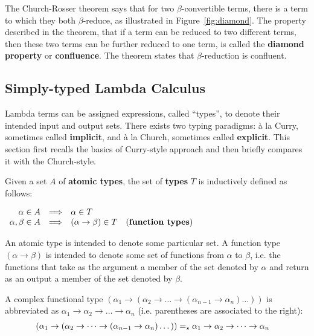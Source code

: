The Church-Rosser theorem says that for two $\beta$-convertible terms, there is a term to which they both $\beta$-reduce, as illustrated in Figure~\ref{fig:diamond}. The property described in the theorem, that if a term can be reduced to two different terms, then these two terms can be further reduced to one term, is called the \textbf{diamond property} or \textbf{confluence}. The theorem states that $\beta$-reduction is confluent.

\subsection{Simply-typed Lambda Calculus}  \label{sec:A2}

Lambda terms can be assigned expressions, called ``types'', to denote their intended input and output sets. There exists two typing paradigms: 
\`{a} la Curry, sometimes called \textbf{implicit}, and \`{a} la Church, sometimes called \textbf{explicit}. This section first recalls the basics of Curry-style approach and then briefly compares it with the Church-style.

\begin{definition} Given a set $A$ of \textbf{atomic types}, the set of \textbf{types} $T$ is inductively defined as follows:
\begin{center}
$
\begin{array}{rcll}
\alpha \in A & \Longrightarrow & \alpha \in T &\\
\alpha, \beta \in A &  \Longrightarrow & (\alpha \rightarrow \beta) \in T & \text{(\textbf{function types})}
\end{array} 
$
\end{center}
\end{definition}
An atomic type is intended to denote some particular set. A function type $(\alpha \rightarrow \beta)$ is intended to denote some set of functions from $\alpha$ to $\beta$, i.e. the functions that take as the argument a member of the set denoted by $\alpha$ and return as an output a member of the set denoted by $\beta$.


\begin{remark} A complex functional type $(\alpha_1 \rightarrow (\alpha_2 \rightarrow \dots \rightarrow (\alpha_{n-1} \rightarrow \alpha_n)  \dots ))$ is abbreviated as $\alpha_1 \rightarrow \alpha_2 \rightarrow \dots \rightarrow \alpha_n$ (i.e. parentheses are associated to the right):
\begin{align*}
(\alpha_1 \rightarrow (\alpha_2 \rightarrow \dots \rightarrow (\alpha_{n-1} \rightarrow \alpha_n)  \dots )) & =_s \alpha_1 \rightarrow \alpha_2 \rightarrow \dots \rightarrow \alpha_n
\end{align*}
\end{remark}


